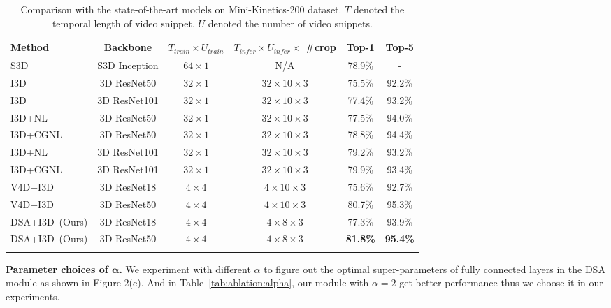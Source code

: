 \documentclass[sigconf]{acmart}
\begin{document}
\begin{table*}[th]
\caption{Comparison with the state-of-the-art models on Mini-Kinetics-200 dataset. $T$ denoted the temporal length of video snippet, $U$ denoted the number of video snippets.}
\begin{center}
\begin{tabular}{lccccc}
\shline
{ Method} & { Backbone} & { $T_{train} \times U_{train}$} & {$T_{infer} \times U_{infer} \times$ \#crop} & {Top-1} & {Top-5}\\
\hline
S3D~\cite{s3d} & {S3D Inception} & {$64 \times 1$} & {N/A}& 78.9\% & -\\
I3D~\cite{CGNLNetwork2018} &{3D ResNet50} & {$32 \times 1$} &{$32 \times 10 \times 3$} &75.5\% & 92.2\% \\
I3D~\cite{CGNLNetwork2018} &{3D ResNet101} & {$32 \times 1$} &{$32 \times 10 \times 3$} &77.4\% & 93.2\% \\
I3D+NL~\cite{CGNLNetwork2018} &{3D ResNet50} & {$32 \times 1$} &{$32 \times 10 \times 3$} &77.5\% & 94.0\% \\
I3D+CGNL~\cite{CGNLNetwork2018} & {3D ResNet50} & {$32 \times 1$} &{$32 \times 10 \times 3$} & 78.8\% & 94.4\% \\
I3D+NL~\cite{CGNLNetwork2018} & {3D ResNet101} & {$32 \times 1$} &{$32 \times 10 \times 3$} & 79.2\% & 93.2\% \\
I3D+CGNL~\cite{CGNLNetwork2018} & {3D ResNet101} & {$32 \times 1$} &{$32 \times 10 \times 3$} & 79.9\% & 93.4\% \\ \hline
V4D+I3D ~\cite{zhang2020v4d} &{3D ResNet18} & {$4 \times 4$} & {$4 \times 10 \times 3$} & 75.6\% &  92.7\% \\
V4D+I3D ~\cite{zhang2020v4d} &{3D ResNet50} & {$4 \times 4$} & {$4 \times 10 \times 3$} & 80.7\% &  95.3\% \\
\hline
DSA+I3D~(Ours) &{3D ResNet18} & {$4 \times 4$} & {$4 \times 8 \times 3$} & 77.3\% &  93.9\% \\
DSA+I3D~(Ours) &{3D ResNet50} & {$4 \times 4$} & {$4 \times 8 \times 3$} & \textbf{81.8\%} &  \textbf{95.4\%} \\
\shline
\end{tabular}
\end{center}
\label{cmp_minik200}
\end{table*} 
\textbf{Parameter choices of $\bm{\alpha}$.}
We experiment with different $\alpha$ to figure out the optimal super-parameters of fully connected layers in the DSA module as shown in Figure 2(c). And in Table~\ref{tab:ablation:alpha}, our module with $\alpha=2$ get better performance thus we choose it in our experiments.
\end{document}
